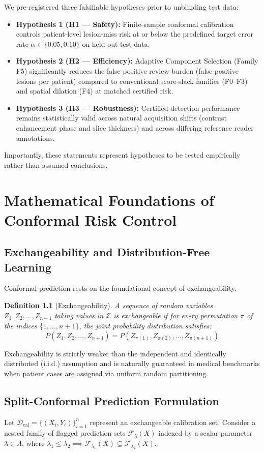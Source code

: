 \documentclass[11pt,a4paper]{report}
\newtheorem{definition}{Definition}[chapter]
\begin{document}
We pre-registered three falsifiable hypotheses prior to unblinding test data:
\begin{itemize}
    \item \textbf{Hypothesis 1 (H1 --- Safety):} Finite-sample conformal calibration controls patient-level lesion-miss risk at or below the predefined target error rate $\alpha \in \{0.05, 0.10\}$ on held-out test data.
    \item \textbf{Hypothesis 2 (H2 --- Efficiency):} Adaptive Component Selection (Family F5) significantly reduces the false-positive review burden (false-positive lesions per patient) compared to conventional score-slack families (F0--F3) and spatial dilation (F4) at matched certified risk.
    \item \textbf{Hypothesis 3 (H3 --- Robustness):} Certified detection performance remains statistically valid across natural acquisition shifts (contrast enhancement phase and slice thickness) and across differing reference reader annotations.
\end{itemize}
Importantly, these statements represent hypotheses to be tested empirically rather than assumed conclusions.

\chapter{Mathematical Foundations of Conformal Risk Control}

\section{Exchangeability and Distribution-Free Learning}
Conformal prediction rests on the foundational concept of exchangeability. 
\begin{definition}[Exchangeability]
A sequence of random variables $Z_1, Z_2, \dots, Z_{n+1}$ taking values in $\mathcal{Z}$ is exchangeable if for every permutation $\pi$ of the indices $\{1, \dots, n+1\}$, the joint probability distribution satisfies:
\begin{equation}
P(Z_1, Z_2, \dots, Z_{n+1}) = P(Z_{\pi(1)}, Z_{\pi(2)}, \dots, Z_{\pi(n+1)})
\end{equation}
\end{definition}
Exchangeability is strictly weaker than the independent and identically distributed (i.i.d.) assumption and is naturally guaranteed in medical benchmarks when patient cases are assigned via uniform random partitioning.

\section{Split-Conformal Prediction Formulation}
Let $\mathcal{D}_{\mathrm{cal}} = \{(X_i, Y_i)\}_{i=1}^n$ represent an exchangeable calibration set. Consider a nested family of flagged prediction sets $\mathcal{F}_\lambda(X)$ indexed by a scalar parameter $\lambda \in \Lambda$, where $\lambda_1 \le \lambda_2 \implies \mathcal{F}_{\lambda_1}(X) \subseteq \mathcal{F}_{\lambda_2}(X)$.
\end{document}
